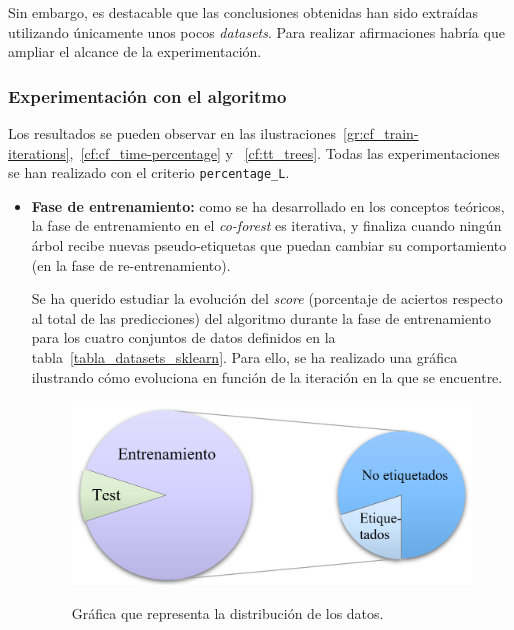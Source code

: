 Sin embargo, es destacable que las conclusiones obtenidas han sido extraídas utilizando únicamente unos pocos \textit{datasets}. Para realizar afirmaciones habría que ampliar el alcance de la experimentación.



\subsubsection{Experimentación con el algoritmo}

Los resultados se pueden observar en las ilustraciones~\ref{gr:cf_train-iterations},~\ref{cf:cf_time-percentage} y ~\ref{cf:tt_trees}. Todas las experimentaciones se han realizado con el criterio \texttt{percentage\_L}.


\begin{itemize}
	\item \textbf{Fase de entrenamiento:} como se ha desarrollado en los conceptos teóricos, la fase de entrenamiento en el \textit{co-forest} es iterativa, y finaliza cuando ningún árbol recibe nuevas pseudo-etiquetas que puedan cambiar su comportamiento (en la fase de re-entrenamiento).
	
	Se ha querido estudiar la evolución del \textit{score} (porcentaje de aciertos respecto al total de las predicciones) del algoritmo durante la fase de entrenamiento para los cuatro conjuntos de datos definidos en la tabla~\ref{tabla_datasets_sklearn}. Para ello, se ha realizado una gráfica ilustrando cómo evoluciona en función de la iteración en la que se encuentre.
	
	\begin{figure}[h]
		\caption[\textit{Co-Forest}: distribución de datos entrenamiento y \textit{test}]{Gráfica que representa la distribución de los datos.}
		\centering
		\includegraphics[scale=0.3]{../img/memoria/5_entrenamiento_particiones}
		\label{5_entrenamiento_particiones}
	\end{figure}


\end{itemize}
